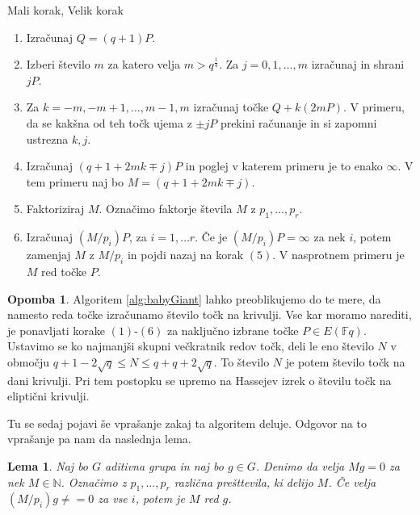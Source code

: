 \documentclass[12pt,a4paper,twoside]{article}
\theoremstyle{definition} %
\newtheorem{opomba}[definicija]{Opomba}
\theoremstyle{plain} %
\newtheorem{lema}[definicija]{Lema}
\numberwithin{equation}{section}  %
\newcommand{\N}{\mathbb N}
\newcommand{\F}{\mathbb F}
\begin{document}
\begin{algorithm}[H]
\caption[MV]{Mali korak, Velik korak}
\label{alg:babyGiant}
\begin{enumerate}
\item Izračunaj $Q = (q+1)P$.
\item Izberi število $m$ za katero velja $m >q^{\frac{1}{4}}$. Za $j = 0,1,\ldots,m$ izračunaj in shrani $jP$.
\item Za $k = -m,-m+1,\ldots,m-1,m$ izračunaj točke $Q +k(2mP)$. V primeru, da se kakšna od teh točk ujema z $\pm jP$ prekini računanje in si zapomni ustrezna $k,j$.
\item Izračunaj $(q+1+2mk \mp j)P$ in poglej v katerem primeru je to enako $\infty$. V tem primeru naj bo $M = (q+1+2mk \mp j)$.
\item Faktoriziraj $M$. Označimo faktorje števila $M$ z $p_1,\ldots,p_r$.
\item Izračunaj $(M/p_i)P$, za $i=1,\ldots r$. Če je $(M/p_i)P = \infty$ za nek $i$, potem zamenjaj $M$ z $M/p_i$ in pojdi nazaj na korak $(5)$. V nasprotnem primeru je $M$ red točke $P$.
\end{enumerate}

\end{algorithm}

\begin{opomba}

Algoritem \ref{alg:babyGiant} lahko preoblikujemo do te mere, da namesto reda točke izračunamo število točk na krivulji. Vse kar moramo narediti, je ponavljati korake $(1)$-$(6)$ za naključno izbrane točke $P \in E(\F{q})$. Ustavimo se ko najmanjši skupni večkratnik redov točk, deli le eno število $N$ v območju $q+1-2\sqrt{q} \leq N \leq q+q+2\sqrt{q}$. To število $N$ je potem število točk na dani krivulji. Pri tem postopku se upremo na Hassejev izrek o številu točk na eliptični krivulji.

\end{opomba}

Tu se sedaj pojavi še vprašanje zakaj ta algoritem deluje. Odgovor na to vprašanje pa nam da naslednja lema.

\begin{lema}

Naj bo $G$ aditivna grupa in naj bo $g\in G$. Denimo da velja $Mg = 0$ za nek $M \in \N$. Označimo z $p_1,\ldots,p_r$ različna prešttevila, ki delijo $M$. Če velja $(M/p_i)g \neq = 0$ za vse $i$, potem je $M$ red $g$.

\end{lema}
\end{document}
